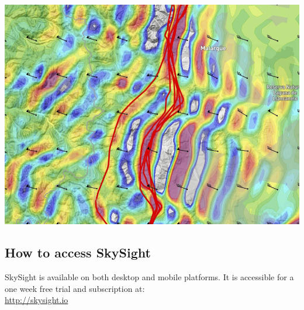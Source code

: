 \documentclass[9pt,a4paper,twocolumn]{article}
\begin{document}
\includegraphics[width=\linewidth]{images/igc_upload.png}

\subsection*{How to access SkySight}
SkySight is available on both desktop and mobile platforms. It is accessible for a one week free trial and subscription at:\\
\url{http://skysight.io}
\end{document}
